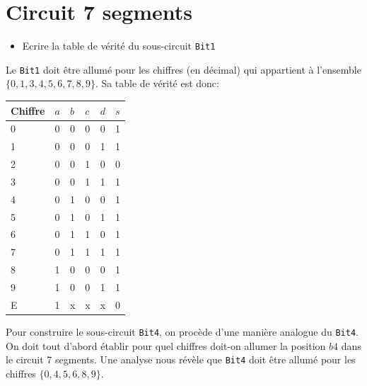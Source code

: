 \documentclass[10pt]{article} %
\begin{document}
\section{Circuit 7 segments}
\begin{itemize}
    \item [\ding{78}] Ecrire la table de vérité du sous-circuit \texttt{Bit1}
\end{itemize}

Le \texttt{Bit1} doit être allumé pour les chiffres (en décimal) qui appartient à l'ensemble $\{0, 1, 3, 4, 5, 6, 7, 8, 9\}$. Sa table de
vérité est donc:

\begin{table}[h!]
    \hspace{2cm}
    \begin{tabular}{l|llll |l}
    Chiffre & $a$ & $b$ & $c$ & $d$ & $s$ \\
    \hline
    0       & 0 & 0 & 0 & 0 & 1 \\
    1       & 0 & 0 & 0 & 1 & 1 \\
    2       & 0 & 0 & 1 & 0 & 0 \\
    3       & 0 & 0 & 1 & 1 & 1 \\
    4       & 0 & 1 & 0 & 0 & 1 \\
    5       & 0 & 1 & 0 & 1 & 1 \\
    6       & 0 & 1 & 1 & 0 & 1 \\
    7       & 0 & 1 & 1 & 1 & 1 \\
    8       & 1 & 0 & 0 & 0 & 1 \\
    9       & 1 & 0 & 0 & 1 & 1 \\
    E       & 1 & x & x & x & 0
    \end{tabular}
    \end{table}


Pour construire le sous-circuit \texttt{Bit4}, on procède d'une manière analogue du \texttt{Bit4}. On doit tout d'abord établir
pour quel chiffres doit-on allumer la position $b4$ dans le circuit 7 segments. Une analyse nous révèle que \texttt{Bit4} doit être allumé
pour les chiffres $\{0, 4, 5, 6, 8, 9\}$.

\newpage
\end{document}
